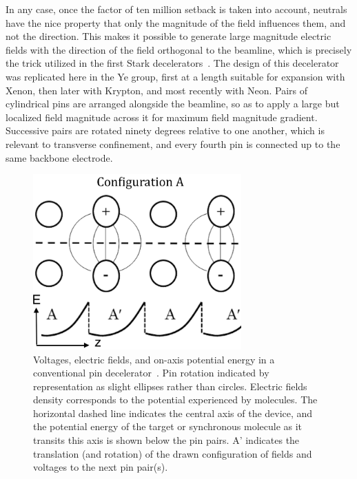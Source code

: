 In any case, once the factor of ten million setback is taken into account, neutrals have the nice property that only the magnitude of the field influences them, and not the direction. 
This makes it possible to generate large magnitude electric fields with the direction of the field orthogonal to the beamline, which is precisely the trick utilized in the first Stark decelerators~\cite{Bethlem1999}.
The design of this decelerator was replicated here in the Ye group, first at a length suitable for expansion with Xenon, then later with Krypton, and most recently with Neon.
Pairs of cylindrical pins are arranged alongside the beamline, so as to apply a large but localized field magnitude across it for maximum field magnitude gradient.
Successive pairs are rotated ninety degrees relative to one another, which is relevant to transverse confinement, and every fourth pin is connected up to the same backbone electrode.

\begin{figure}[ht!]
\centering
\label{decelcartoon}
\includegraphics[width=8cm]{Slowing/chargecartoon.png}%
\caption{
Voltages, electric fields, and on-axis potential energy in a conventional pin decelerator~\cite{Bethlem1999}. Pin rotation indicated by representation as slight ellipses rather than circles. Electric fields density corresponds to the potential experienced by molecules. The horizontal dashed line indicates the central axis of the device, and the potential energy of the target or synchronous molecule as it transits this axis is shown below the pin pairs. A' indicates the translation (and rotation) of the drawn configuration of fields and voltages to the next pin pair(s). 
}
\end{figure}

